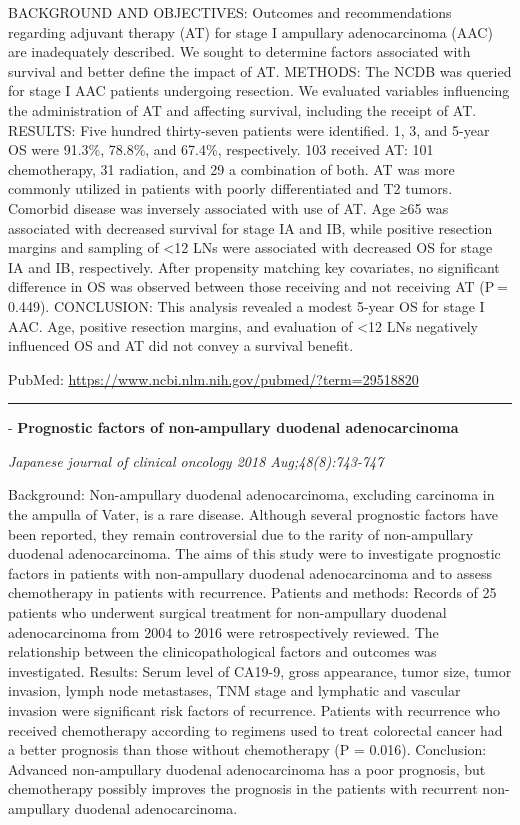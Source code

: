 \documentclass[]{article}
\begin{document}
BACKGROUND AND OBJECTIVES: Outcomes and recommendations regarding
adjuvant therapy (AT) for stage I ampullary adenocarcinoma (AAC) are
inadequately described. We sought to determine factors associated with
survival and better define the impact of AT. METHODS: The NCDB was
queried for stage I AAC patients undergoing resection. We evaluated
variables influencing the administration of AT and affecting survival,
including the receipt of AT. RESULTS: Five hundred thirty-seven patients
were identified. 1, 3, and 5-year OS were 91.3\%, 78.8\%, and 67.4\%,
respectively. 103 received AT: 101 chemotherapy, 31 radiation, and 29 a
combination of both. AT was more commonly utilized in patients with
poorly differentiated and T2 tumors. Comorbid disease was inversely
associated with use of AT. Age ≥65 was associated with decreased
survival for stage IA and IB, while positive resection margins and
sampling of \textless{}12 LNs were associated with decreased OS for
stage IA and IB, respectively. After propensity matching key covariates,
no significant difference in OS was observed between those receiving and
not receiving AT (P = 0.449). CONCLUSION: This analysis revealed a
modest 5-year OS for stage I AAC. Age, positive resection margins, and
evaluation of \textless{}12 LNs negatively influenced OS and AT did not
convey a survival benefit.

PubMed: \url{https://www.ncbi.nlm.nih.gov/pubmed/?term=29518820}

{}

{}

\begin{center}\rule{0.5\linewidth}{\linethickness}\end{center}

 - \textbf{Prognostic factors of non-ampullary duodenal adenocarcinoma}

\emph{Japanese journal of clinical oncology 2018 Aug;48(8):743-747}

Background: Non-ampullary duodenal adenocarcinoma, excluding carcinoma
in the ampulla of Vater, is a rare disease. Although several prognostic
factors have been reported, they remain controversial due to the rarity
of non-ampullary duodenal adenocarcinoma. The aims of this study were to
investigate prognostic factors in patients with non-ampullary duodenal
adenocarcinoma and to assess chemotherapy in patients with recurrence.
Patients and methods: Records of 25 patients who underwent surgical
treatment for non-ampullary duodenal adenocarcinoma from 2004 to 2016
were retrospectively reviewed. The relationship between the
clinicopathological factors and outcomes was investigated. Results:
Serum level of CA19-9, gross appearance, tumor size, tumor invasion,
lymph node metastases, TNM stage and lymphatic and vascular invasion
were significant risk factors of recurrence. Patients with recurrence
who received chemotherapy according to regimens used to treat colorectal
cancer had a better prognosis than those without chemotherapy (P =
0.016). Conclusion: Advanced non-ampullary duodenal adenocarcinoma has a
poor prognosis, but chemotherapy possibly improves the prognosis in the
patients with recurrent non-ampullary duodenal adenocarcinoma.
\end{document}
